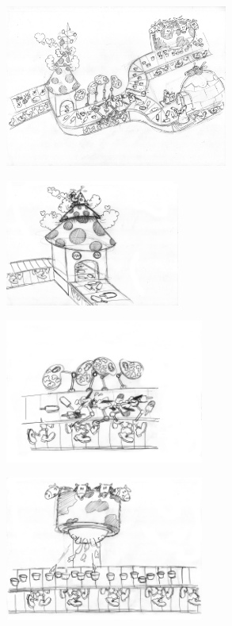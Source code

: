 \documentclass[a4paper]{scrartcl}
\begin{document}
    \centering
    \begin{multicols}{2}
       \includegraphics[width=0.55\textwidth]{references/01}

       \hfill \includegraphics[width=0.43\textwidth]{references/02}
    \end{multicols}

    \begin{multicols}{2}
       \includegraphics[width=0.49\textwidth]{references/03}

       \includegraphics[width=0.49\textwidth]{references/04}
    \end{multicols}
\end{document}

